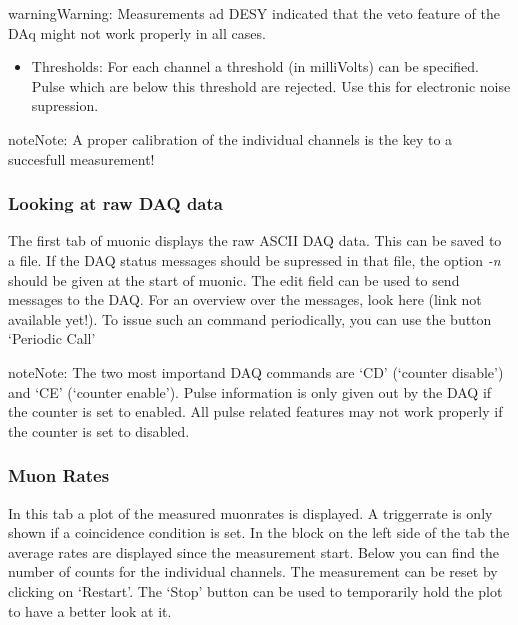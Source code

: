 \documentclass[letterpaper,10pt,english]{sphinxmanual}
\begin{document}
\begin{notice}{warning}{Warning:}
Measurements ad DESY indicated that the veto feature of the DAq might not work properly in all cases.
\end{notice}
\begin{itemize}
\item {} 
Thresholds: For each channel a threshold (in milliVolts) can be specified. Pulse which are below this threshold are rejected. Use this for electronic noise supression.

\end{itemize}

\begin{notice}{note}{Note:}
A proper calibration of the individual channels is the key to a succesfull measurement!
\end{notice}


\subsubsection{Looking at raw DAQ data}
\label{tutorial:looking-at-raw-daq-data}
The first tab of muonic displays the raw ASCII DAQ data.
This can be saved to a file. If the DAQ status messages should be supressed in that file, the option \emph{-n} should be given at the start of muonic.
The edit field can be used to send messages to the DAQ. For an overview over the messages, look here (link not available yet!).
To issue such an command periodically, you can use the button `Periodic Call'

\begin{notice}{note}{Note:}
The two most importand DAQ commands are `CD' (`counter disable') and `CE' (`counter enable'). Pulse information is only given out by the DAQ if the counter is set to enabled. All pulse related features may not work properly if the counter is set to disabled.
\end{notice}


\subsubsection{Muon Rates}
\label{tutorial:muon-rates}
In this tab a plot of the measured muonrates is displayed. A triggerrate is only shown if a coincidence condition is set.
In the block on the left side of the tab the average rates are displayed since the measurement start. Below you can find the number of counts for the individual channels. The measurement can be reset by clicking on `Restart'. The `Stop' button can be used to temporarily hold the plot to have a better look at it.
\end{document}
